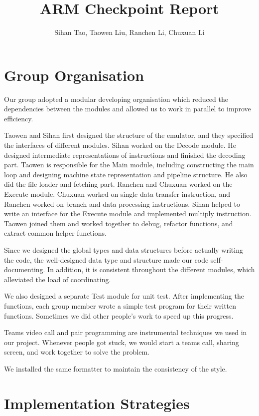 \documentclass[10pt]{article}
\begin{document}
	
	\title{ARM Checkpoint Report}
	\author{Sihan Tao, Taowen Liu, Ranchen Li, Chuxuan Li}
	
	\maketitle
	
	\section{Group Organisation}
	
	Our group adopted a modular developing organisation which reduced the dependencies between the modules and allowed us to work in parallel to improve efficiency.
	
	Taowen and Sihan first designed the structure of the emulator, and they specified the interfaces of different modules. Sihan worked on the Decode module. He designed intermediate representations of instructions and finished the decoding part. Taowen is responsible for the Main module, including constructing the main loop and designing machine state representation and pipeline structure. He also did the file loader and fetching part. Ranchen and Chuxuan worked on the Execute module. Chuxuan worked on single data transfer instruction, and Ranchen worked on branch and data processing instructions. Sihan helped to write an interface for the Execute module and implemented multiply instruction. Taowen joined them and worked together to debug, refactor functions, and extract common helper functions.
	
	Since we designed the global types and data structures before actually writing the code, the well-designed data type and structure made our code self-documenting. In addition, it is consistent throughout the different modules, which alleviated the load of coordinating.
	
	We also designed a separate Test module for unit test. After implementing the functions, each group member wrote a simple test program for their written functions. Sometimes we did other people's work to speed up this progress.
	
	Teams video call and pair programming are instrumental techniques we used in our project. Whenever people got stuck, we would start a teams call, sharing screen, and work together to solve the problem.
	
	We installed the same formatter to maintain the consistency of the style.
	
	\section{Implementation Strategies}
	
\end{document}
